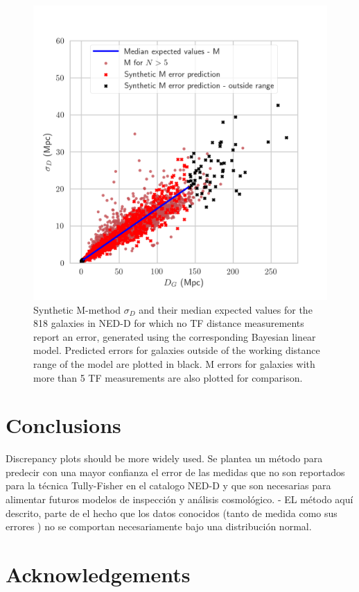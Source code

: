 \documentclass[a4paper,fleqn,usenatbib]{mnras}
\begin{document}
\begin{figure}
	\includegraphics[scale=0.7]{predl2.png}
    \caption{Synthetic M-method $\sigma_D$ and their median expected values for the 818 galaxies in NED-D for which no TF distance measurements report an error, generated using the corresponding Bayesian linear model. Predicted errors for galaxies outside of the working distance range of the model are plotted in black. M errors for galaxies with more than 5 TF measurements are also plotted for comparison.}
    \label{fig:predl2}
\end{figure}

\section{Conclusions}

Discrepancy plots should be more widely used. Se plantea un método para predecir con una mayor confianza el error de las medidas que no son reportados para la técnica Tully-Fisher en el catalogo NED-D y que son necesarias para alimentar futuros modelos de inspección y análisis cosmológico.
- EL método aquí descrito, parte de el hecho que los  datos conocidos (tanto de medida como sus errores )  no se comportan necesariamente bajo una distribución normal.

\section*{Acknowledgements}
\end{document}
